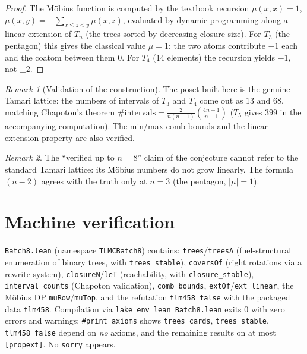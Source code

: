 \documentclass[11pt]{article}
\theoremstyle{definition}
\theoremstyle{remark}
\newtheorem*{remark}{Remark}
\begin{document}
\begin{proof}
The Möbius function is computed by the textbook recursion $\mu(x,x) = 1$, $\mu(x,y) = -\sum_{x \le z < y} \mu(x,z)$, evaluated by dynamic programming along a linear extension of $T_n$ (the trees sorted by decreasing closure size). For $T_3$ (the pentagon) this gives the classical value $\mu = 1$: the two atoms contribute $-1$ each and the coatom between them $0$. For $T_4$ (14 elements) the recursion yields $-1$, not $\pm 2$.
\end{proof}

\begin{remark}[Validation of the construction]
The poset built here is the genuine Tamari lattice: the numbers of intervals of $T_3$ and $T_4$ come out as $13$ and $68$, matching Chapoton's theorem $\#\text{intervals} = \frac{2}{n(n+1)}\binom{4n+1}{n-1}$ ($T_5$ gives $399$ in the accompanying computation). The min/max comb bounds and the linear-extension property are also verified.
\end{remark}

\begin{remark}
The ``verified up to $n=8$'' claim of the conjecture cannot refer to the standard Tamari lattice: its Möbius numbers do not grow linearly. The formula $(n-2)$ agrees with the truth only at $n = 3$ (the pentagon, $|\mu| = 1$).
\end{remark}

\section{Machine verification}

\texttt{Batch8.lean} (namespace \texttt{TLMCBatch8}) contains: \texttt{trees}/\texttt{treesA} (fuel-structural enumeration of binary trees, with \texttt{trees\_stable}), \texttt{coversOf} (right rotations via a rewrite system), \texttt{closureN}/\texttt{leT} (reachability, with \texttt{closure\_stable}), \texttt{interval\_counts} (Chapoton validation), \texttt{comb\_bounds}, \texttt{extOf}/\texttt{ext\_linear}, the Möbius DP \texttt{muRow}/\texttt{muTop}, and the refutation \texttt{tlm458\_false} with the packaged data \texttt{tlm458}. Compilation via \texttt{lake env lean Batch8.lean} exits $0$ with zero errors and warnings; \texttt{\#print axioms} shows \texttt{trees\_cards}, \texttt{trees\_stable}, \texttt{tlm458\_false} depend on \emph{no} axioms, and the remaining results on at most \texttt{[propext]}. No \texttt{sorry} appears.
\end{document}
